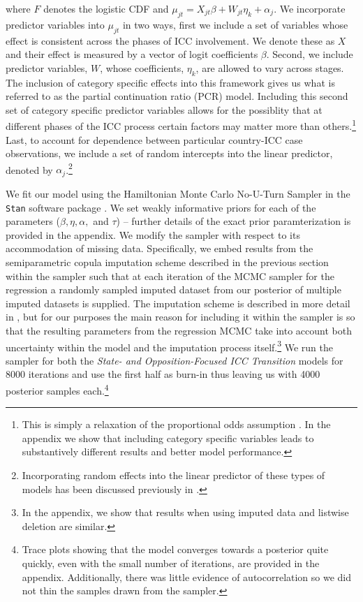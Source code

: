 where $F$ denotes the logistic CDF and $\mu_{jt} = X_{jt} \beta + W_{jt}\eta_{k} + \alpha_{j}$. We incorporate predictor variables into $\mu_{jt}$ in two ways, first we include a set of variables whose effect is consistent across the phases of ICC involvement. We denote these as $X$ and their effect is measured by a vector of logit coefficients $\beta$. Second, we include predictor variables, $W$, whose coefficients, $\eta_{k}$, are allowed to vary across stages. The inclusion of category specific effects into this framework gives us what is referred to as the partial continuation ratio (PCR) model. Including this second set of category specific predictor variables allows for the possiblity that at different phases of the ICC process certain factors may matter more than others.\footnote{This is simply a relaxation of the proportional odds assumption \citep{peterson1990partial}. In the appendix we show that including category specific variables leads to substantively different results and better model performance.} Last, to account for dependence between particular country-ICC case observations, we include a set of random intercepts into the linear predictor, denoted by $\alpha_{j}$.\footnote{Incorporating random effects into the linear predictor of these types of models has been discussed previously in \citet{have:uttal:1994, tutz:hennevogl:1996, dos2000continuation, hartzel2001multinomial}.}

We fit our model using the Hamiltonian Monte Carlo No-U-Turn Sampler in the \texttt{Stan} software package \citep{carpenter2017stan}. We set weakly informative priors for each of the parameters ($\beta, \eta, \alpha,$  and $\tau$) -- further details of the exact prior paramterization is provided in the appendix. We modify the sampler with respect to its accommodation of missing data. Specifically, we embed results from the semiparametric copula imputation scheme described in the previous section within the sampler such that at each iteration of the MCMC sampler for the regression a randomly sampled imputed dataset from our posterior of multiple imputed datasets is supplied. The imputation scheme is described in more detail in \citep{hollenbach:etal:2018}, but for our purposes the main reason for including it within the sampler is so that the resulting parameters from the regression MCMC take into account both uncertainty within the model and the imputation process itself.\footnote{In the appendix, we show that results when using imputed data and listwise deletion are similar.} We run the sampler for both the \emph{State- and Opposition-Focused ICC Transition} models for 8000 iterations and use the first half as burn-in thus leaving us with 4000 posterior samples each.\footnote{Trace plots showing that the model converges towards a posterior quite quickly, even with the small number of iterations, are provided in the appendix. Additionally, there was little evidence of autocorrelation so we did not thin the samples drawn from the sampler.}

